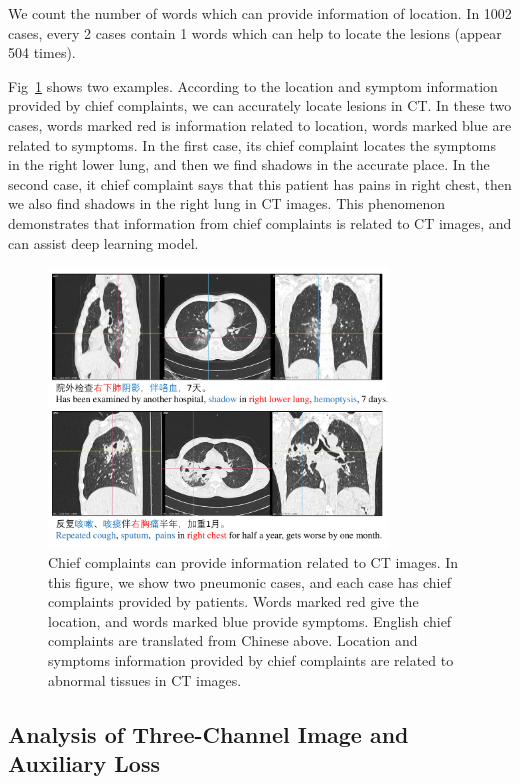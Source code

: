 \documentclass[journal]{IEEEtran}
\begin{document}
We count the number of words which can provide information of location. In 1002 cases, every 2 cases contain 1 words which can help to locate the lesions (appear 504 times). 

Fig~\ref{txtpic} shows two examples. According to the location and symptom information provided by chief complaints, we can accurately locate lesions in CT. 
In these two cases, words marked red is information related to location, words marked blue are related to symptoms. In the first case, its chief complaint locates the symptoms in the right lower lung, and then we find shadows in the accurate place. In the second case, it chief complaint says that this patient has pains in right chest, then we also find shadows in the right lung in CT images.
This phenomenon demonstrates that information from chief complaints is related to CT images, and can assist deep learning model.

\begin{figure}[t]
    \centerline{\includegraphics[width=90mm]{txtpic.pdf}}
    \vspace{-0cm}
    \caption{Chief complaints can provide information related to CT images. In this figure, we show two pneumonic cases, and each case has chief complaints provided by patients. Words marked red give the location, and words marked blue provide symptoms. English chief complaints are translated from Chinese above. Location and symptoms information provided by chief complaints are related to abnormal tissues in CT images.}
    \vspace{-0cm}
    \label{txtpic}
    \end{figure}
    
\subsection{Analysis of Three-Channel Image and Auxiliary Loss}
\label{effectiveness}
\end{document}
